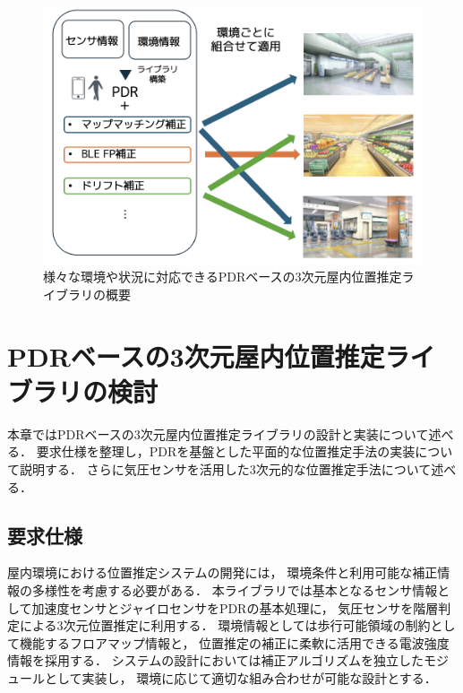 \documentclass[a4paper, 10pt, twocolumn]{jarticle}
\begin{document}
\begin{figure}[h]
	\centering
	\includegraphics[width=\linewidth]{image/first.png}
	\caption{様々な環境や状況に対応できるPDRベースの3次元屋内位置推定ライブラリの概要}    \label{fig:overview}
\end{figure}


\section{PDRベースの3次元屋内位置推定ライブラリの検討}
本章ではPDRベースの3次元屋内位置推定ライブラリの設計と実装について述べる．
要求仕様を整理し，PDRを基盤とした平面的な位置推定手法の実装について説明する．
さらに気圧センサを活用した3次元的な位置推定手法について述べる．


\subsection{要求仕様}
屋内環境における位置推定システムの開発には，
環境条件と利用可能な補正情報の多様性を考慮する必要がある．
本ライブラリでは基本となるセンサ情報として加速度センサとジャイロセンサをPDRの基本処理に，
気圧センサを階層判定による3次元位置推定に利用する．
環境情報としては歩行可能領域の制約として機能するフロアマップ情報と，
位置推定の補正に柔軟に活用できる電波強度情報を採用する．
システムの設計においては補正アルゴリズムを独立したモジュールとして実装し，
環境に応じて適切な組み合わせが可能な設計とする．


\end{document}
